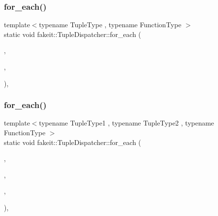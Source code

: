 \mbox{\label{structfakeit_1_1TupleDispatcher_af22c1fae8c695f722da986df9af411ca}} 
\subsubsection{\texorpdfstring{for\_each()}{for\_each()}\hspace{0.1cm}{\footnotesize\ttfamily [18/54]}}
{\footnotesize\ttfamily template$<$typename Tuple\+Type , typename Function\+Type $>$ \\
static void fakeit\+::\+Tuple\+Dispatcher\+::for\+\_\+each (\begin{DoxyParamCaption}\item[{Tuple\+Type \&\&}]{,  }\item[{Function\+Type \&}]{,  }\item[{std\+::integral\+\_\+constant$<$ size\+\_\+t, std\+::tuple\+\_\+size$<$ typename std\+::remove\+\_\+reference$<$ Tuple\+Type $>$\+::type $>$\+::value $>$}]{ }\end{DoxyParamCaption})\hspace{0.3cm}{\ttfamily [inline]}, {\ttfamily [static]}}

\mbox{\label{structfakeit_1_1TupleDispatcher_a30fb1a59df83f4faaa461d3fee4b20bc}} 
\subsubsection{\texorpdfstring{for\_each()}{for\_each()}\hspace{0.1cm}{\footnotesize\ttfamily [19/54]}}
{\footnotesize\ttfamily template$<$typename Tuple\+Type1 , typename Tuple\+Type2 , typename Function\+Type $>$ \\
static void fakeit\+::\+Tuple\+Dispatcher\+::for\+\_\+each (\begin{DoxyParamCaption}\item[{Tuple\+Type1 \&\&}]{,  }\item[{Tuple\+Type2 \&\&}]{,  }\item[{Function\+Type \&}]{,  }\item[{std\+::integral\+\_\+constant$<$ size\+\_\+t, std\+::tuple\+\_\+size$<$ typename std\+::remove\+\_\+reference$<$ Tuple\+Type1 $>$\+::type $>$\+::value $>$}]{ }\end{DoxyParamCaption})\hspace{0.3cm}{\ttfamily [inline]}, {\ttfamily [static]}}

